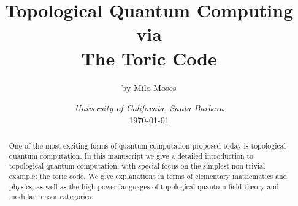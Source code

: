 \documentclass{article}
\title{Topological Quantum Computing\\ via \\ The Toric Code}
\author{by Milo Moses}
\date{\textit{University of California, Santa Barbara} \\ [2ex] \today}
\theoremstyle{definition}
\numberwithin{figure}{section}
\begin{document}
\maketitle

\newcommand{\RR}{\mathbb{R}}
\newcommand{\HH}{\mathbb{H}}
\newcommand{\NN}{\mathbb{N}}
\newcommand{\QQ}{\mathbb{Q}}
\newcommand{\CC}{\mathbb{C}}
\newcommand{\FF}{\mathbb{F}}
\newcommand{\ZZ}{\mathbb{Z}}
\newcommand{\Zcal}{\mathcal{Z}}
\newcommand{\Ncal}{\mathcal{N}}
\newcommand{\LL}{\mathscr{L}}
\newcommand{\TT}{\mathcal{T}}
\newcommand{\Ccat}{\mathscr{C}}
\newcommand{\Dcat}{\mathscr{D}}
\newcommand{\Ecat}{\mathscr{E}}
\newcommand{\st}{\,\,\mathrm{s.t.}\,\,}
\newcommand{\mm}{\mathfrak{m}}
\newcommand{\pp}{\mathfrak{p}}
\newcommand{\Hom}{\mathrm{Hom}}
\newcommand{\Aut}{\mathrm{Aut}}
\newcommand{\Frac}{\mathrm{Frac}}
\newcommand{\tr}{\mathrm{tr}}
\newcommand{\op}{\mathrm{op}}
\newcommand{\res}{\mathrm{res}}
\newcommand{\im}{\mathrm{im}}
\newcommand{\ev}{\mathrm{ev}}
\newcommand{\coev}{\mathrm{coev}}
\newcommand{\id}{\mathrm{id}}
\newcommand{\coker}{\mathrm{coker}}
\newcommand{\SL}{\mathrm{SL}}
\newcommand{\End}{\mathrm{End}}
\newcommand{\Rep}{\bold{Rep}}
\newcommand{\Set}{\bold{Set}}
\newcommand{\Vecc}{\bold{Vec}}
\newcommand{\Top}{\bold{Top}}
\newcommand{\Grp}{\bold{Grp}}
\newcommand{\Hilb}{\bold{Hilb}}
\newcommand{\Bord}{\bold{Bord}}
\newcommand{\Cat}{\bold{Cat}}
\newcommand{\0}{\left|0\right>}
\newcommand{\1}{\left|1\right>}
\newcommand{\nullclass}{\left|\bold{0}\right>}
\newcommand{\alphaclass}{\left|\alpha\right>}
\newcommand{\betaclass}{\left|\beta\right>}
\newcommand{\alphabetaclass}{\left|\alpha\beta\right>}
\newcommand{\ppsi}{\left|\psi\right>}
\newcommand{\pphi}{\left|\phi\right>}
\newcommand{\bigleadsto}{\mathlarger{\mathlarger{\mathlarger{\leadsto}}}}
\newcommand{\vin}{\rotatebox[origin=c]{-90}{$\in$}}


\begin{abstract}
One of the most exciting forms of quantum computation proposed today is topological quantum computation. In this manuscript we give a detailed introduction to topological quantum computation, with special focus on the simplest non-trivial example: the toric code. We give explanations in terms of elementary mathematics and physics, as well as the high-power languages of topological quantum field theory and modular tensor categories.
\end{abstract}

\newpage

\tableofcontents

\newpage
\end{document}
